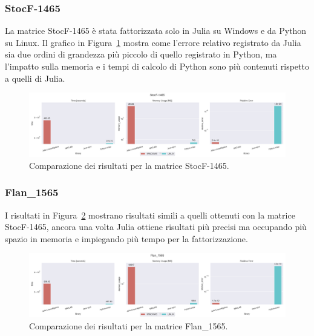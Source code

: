 \documentclass[a4paper, 12pt]{article}
\begin{document}
\subsubsection{StocF-1465}
La matrice StocF-1465 è stata fattorizzata solo in Julia su Windows e da Python
su Linux. Il grafico in Figura~\ref{fig:StocF-1465} mostra come l'errore
relativo registrato da Julia sia due ordini di grandezza più piccolo di
quello registrato in Python, ma l'impatto sulla memoria e i tempi di calcolo di
Python sono più contenuti rispetto a quelli di Julia.
\begin{figure}[ht]
\includegraphics[width=\textwidth]{StocF-1465}
\caption{Comparazione dei risultati per la matrice StocF-1465.}
\label{fig:StocF-1465}
\end{figure}
\subsubsection{Flan\_1565}
I risultati in Figura~\ref{fig:Flan_1565} mostrano risultati simili a quelli
ottenuti con la matrice StocF-1465, ancora una volta Julia ottiene risultati più
precisi ma occupando più spazio in memoria e impiegando più tempo per la
fattorizzazione.
\begin{figure}[ht]
\includegraphics[width=\textwidth]{Flan_1565}
\caption{Comparazione dei risultati per la matrice Flan\_1565.}
\label{fig:Flan_1565}
\end{figure}
\end{document}
